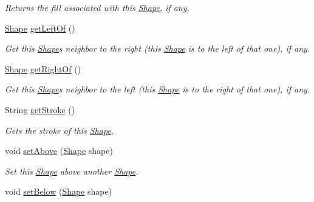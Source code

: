\begin{DoxyCompactItemize}
\begin{DoxyCompactList}\small\item\em Returns the fill associated with this \hyperlink{classcom_1_1aarrelaakso_1_1drawl_1_1_shape}{Shape}, if any. \end{DoxyCompactList}\item 
\hyperlink{classcom_1_1aarrelaakso_1_1drawl_1_1_shape}{Shape} \hyperlink{classcom_1_1aarrelaakso_1_1drawl_1_1_shape_a2b19d5964ac46d545a7bae3133df6532}{get\+Left\+Of} ()
\begin{DoxyCompactList}\small\item\em Get this \hyperlink{classcom_1_1aarrelaakso_1_1drawl_1_1_shape}{Shape}\textquotesingle{}s neighbor to the right (this \hyperlink{classcom_1_1aarrelaakso_1_1drawl_1_1_shape}{Shape} is to the left of that one), if any. \end{DoxyCompactList}\item 
\hyperlink{classcom_1_1aarrelaakso_1_1drawl_1_1_shape}{Shape} \hyperlink{classcom_1_1aarrelaakso_1_1drawl_1_1_shape_a1ad573b06f341aa79f6a255a476ae6e4}{get\+Right\+Of} ()
\begin{DoxyCompactList}\small\item\em Get this \hyperlink{classcom_1_1aarrelaakso_1_1drawl_1_1_shape}{Shape}\textquotesingle{}s neighbor to the left (this \hyperlink{classcom_1_1aarrelaakso_1_1drawl_1_1_shape}{Shape} is to the right of that one), if any. \end{DoxyCompactList}\item 
String \hyperlink{classcom_1_1aarrelaakso_1_1drawl_1_1_shape_a4e1d54c7e161e3af5053939ddefdf9e6}{get\+Stroke} ()
\begin{DoxyCompactList}\small\item\em Gets the stroke of this \hyperlink{classcom_1_1aarrelaakso_1_1drawl_1_1_shape}{Shape}. \end{DoxyCompactList}\item 
void \hyperlink{classcom_1_1aarrelaakso_1_1drawl_1_1_shape_a942b3cf3365498dc1ac6b0309ce33b86}{set\+Above} (\hyperlink{classcom_1_1aarrelaakso_1_1drawl_1_1_shape}{Shape} shape)
\begin{DoxyCompactList}\small\item\em Set this \hyperlink{classcom_1_1aarrelaakso_1_1drawl_1_1_shape}{Shape} above another \hyperlink{classcom_1_1aarrelaakso_1_1drawl_1_1_shape}{Shape}. \end{DoxyCompactList}\item 
void \hyperlink{classcom_1_1aarrelaakso_1_1drawl_1_1_shape_aa0ec0030515b5096820e4dd030c0b320}{set\+Below} (\hyperlink{classcom_1_1aarrelaakso_1_1drawl_1_1_shape}{Shape} shape)

\end{DoxyCompactItemize}
